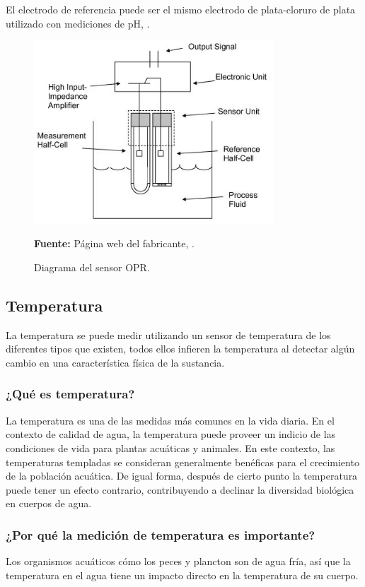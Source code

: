 El electrodo de referencia puede ser el mismo electrodo de plata-cloruro de plata utilizado con mediciones de pH, \cite{li_chapter_2019}.

\begin{figure}[ht]
    \centering
    \includegraphics[width=0.8\textwidth]{Imagenes/cap2/ORP_Sensor_Image.jpg}
    \caption {Diagrama del sensor OPR. }
    \textbf{Fuente:} Página web del fabricante,
    \cite{orp_sensor_measure_nodate}.
    \label{fig:opr}
\end{figure}

\subsection{Temperatura}
La temperatura se puede medir utilizando un sensor de temperatura de los diferentes tipos que existen, todos ellos infieren la temperatura al detectar alg\'un cambio en una caracter\'istica f\'isica de la sustancia.

\subsubsection{¿Qué es temperatura?}
La temperatura es una de las medidas más comunes en la vida diaria. 
En el contexto de calidad de agua, la temperatura puede proveer un indicio de las condiciones de vida para plantas acu\'aticas y animales. En este contexto, las temperaturas templadas se consideran generalmente ben\'eficas para el crecimiento de la poblaci\'on acu\'atica. 
De igual forma, despu\'es de cierto punto la temperatura puede tener un efecto contrario, contribuyendo a declinar la diversidad biol\'ogica en cuerpos de agua.

\subsubsection{¿Por qu\'e la medición de temperatura es importante?}
Los organismos acu\'aticos c\'omo los peces y plancton son de agua fr\'ia, as\'i que la temperatura en el agua tiene un impacto directo en la temperatura de su cuerpo. 

